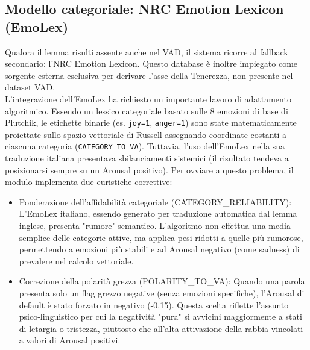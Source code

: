 \subsection{Modello categoriale: NRC Emotion Lexicon (EmoLex)}       
Qualora il lemma risulti assente anche nel VAD, il sistema ricorre al fallback secondario: l'NRC Emotion Lexicon. Questo database è inoltre impiegato 
come sorgente esterna esclusiva per derivare l'asse della Tenerezza, non presente nel dataset VAD.\\
L'integrazione dell'EmoLex ha richiesto un importante lavoro di adattamento algoritmico. Essendo un lessico categoriale basato sulle 8 emozioni di base 
di Plutchik, le etichette binarie (es. \texttt{joy=1}, \texttt{anger=1}) sono state matematicamente proiettate sullo spazio vettoriale di Russell 
assegnando coordinate costanti a ciascuna categoria (\texttt{CATEGORY\_TO\_VA}). Tuttavia, l'uso dell'EmoLex nella sua traduzione italiana presentava 
sbilanciamenti sistemici (il risultato tendeva a posizionarsi sempre su un Arousal positivo). Per ovviare a questo problema, il modulo implementa 
due euristiche correttive:
\begin{itemize}
    \item Ponderazione dell'affidabilità categoriale (CATEGORY\_RELIABILITY): L'EmoLex italiano, essendo generato per traduzione automatica dal lemma inglese, 
    presenta "rumore" semantico. L'algoritmo non effettua una media semplice delle categorie attive, ma applica pesi ridotti a quelle più rumorose, 
    permettendo a emozioni più stabili e ad Arousal negativo (come sadness) di prevalere nel calcolo vettoriale.
    \item Correzione della polarità grezza (POLARITY\_TO\_VA): Quando una parola presenta solo un flag grezzo negative (senza emozioni specifiche), 
    l'Arousal di default è stato forzato in negativo (-0.15). Questa scelta riflette l'assunto psico-linguistico per cui la negatività "pura" 
    si avvicini maggiormente a stati di letargia o tristezza, piuttosto che all'alta attivazione della rabbia vincolati a  valori di Arousal positivi.
\end{itemize}

